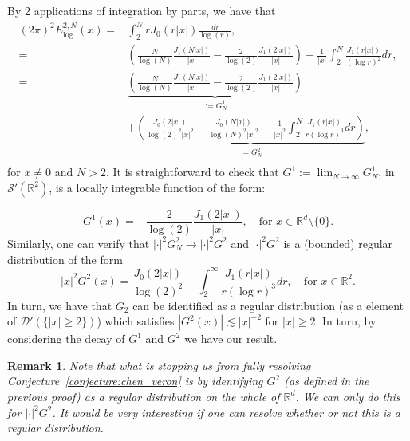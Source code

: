 \documentclass[11pt]{amsart}
\newcommand{\R}{\mathbb{R}}
\newtheorem{remark}{Remark}
\begin{document}
\begin{itemize}
By 2 applications of integration by parts, we have that 
\begin{equation*}
	\begin{split}
		(2\pi)^2{E}_{\log}^{2,N}(x)
		=&\int_{2}^{N}rJ_0(r|x|)\frac{\,dr}{\log(r)},\\
			=& \left (\frac{N}{\log(N)}\frac{J_1(N|x|)}{|x|}- \frac{2}{\log(2)}\frac{J_1(2|x|)}{|x|}\right ) - \frac{1}{|x|}\int_2^N \frac{J_1(r|x|)}{ (\log r)^2} dr,\\
			=& \underbrace{\left (\frac{N}{\log(N)}\frac{J_1(N|x|)}{|x|}- \frac{2}{\log(2)}\frac{J_1(2|x|)}{|x|}\right )}_{:=G_{N}^{1}}\\
			&+\underbrace{\left (\frac{J_0(2|x|)}{\log(2)^2|x|^2}-\frac{J_0(N|x|)}{\log(N)^2|x|^2} - \frac{1}{|x|^2}\int_2^N \frac{J_1(r|x|)}{ r(\log r)^3} dr\right )}_{:=G_{N}^{2}},\\
	\end{split}
\end{equation*}
for $x\ne 0$ and $N>2$. It is straightforward to check that $G^{1}:=\lim_{N\rightarrow \infty}G^{1}_{N}$, in $\mathcal{S}'(\R^2)$, is a locally integrable function of the form:

\begin{equation*}
	G^{1}(x)=- \frac{2}{\log(2)}\frac{J_1(2|x|)}{|x|}, \quad \text{for $x\in \R^d\setminus\{0\}$}.
\end{equation*}
Similarly, one can verify that $|\cdot|^2G_{N}^{2}\rightarrow |\cdot|^2G^{2}$ and $|\cdot|^2G^{2}$ is a (bounded) regular distribution of the form 
\begin{equation*}
	|x|^2G^{2}(x)=\frac{J_0(2|x|)}{\log(2)^2} - \int_2^\infty \frac{J_1(r|x|)}{ r(\log r)^3} dr, \quad \text{for $x\in \R^2$.}
\end{equation*}
In turn, we have that $G_{2}$ can be identified as a regular distribution (as a element of $\mathcal{D}'(\{|x|\geq 2\})$) which satisfies $|G^{2}(x)|\lesssim |x|^{-2}$ for $|x|\geq 2$. In turn, by considering the decay of $G^{1}$ and $G^2$ we have our result. 

\end{itemize}
\begin{remark}
	Note that what is stopping us from fully resolving Conjecture~\ref{conjecture:chen_veron} is by identifying $G^2$ (as defined in the previous proof) as a regular distribution on the whole of $\R^d$. We can only do this for $|\cdot |^2G^2$. It would be very interesting if one can resolve whether or not this is a regular distribution. 
\end{remark}
\end{document}
